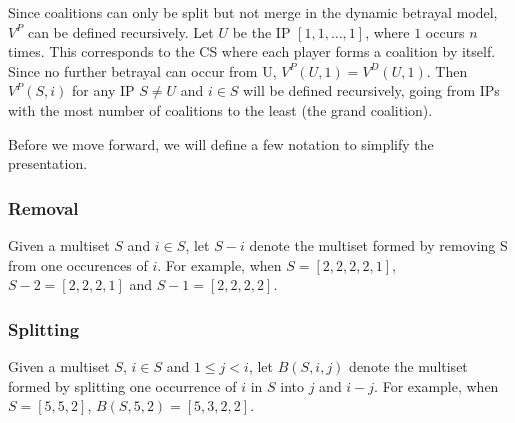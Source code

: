 \documentclass[sigconf,anonymous]{aamas}
\begin{document}
Since coalitions can only be split but not merge in the dynamic betrayal model, $V^P$ can be defined recursively. Let $U$ be the IP $[1, 1, \dots, 1]$, where $1$ occurs $n$ times. This corresponds to the CS where each player forms a coalition by itself. Since no further betrayal can occur from U, $V^P(U, 1)=V^D(U, 1)$. Then $V^P(S, i)$ for any IP $S \neq U$ and $i \in S$ will be defined recursively, going from IPs with the most number of coalitions to the least (the grand coalition).

Before we move forward, we will define a few notation to simplify the presentation. 

\subsubsection{Removal}

Given a multiset $S$ and $i\in S$, let $S - i$ denote the multiset formed by removing S from one occurences of $i$. For example, when $S=[2,2,2,2,1] $, $S-2=[2,2,2,1]$ and $S-1=[2,2,2,2]$. 

\subsubsection{Splitting}

Given a multiset $S$, $i \in S$ and $1 \leq j < i$, let $B(S, i, j)$ denote the multiset formed by splitting one occurrence of $i$ in $S$ into $j$ and $i-j$. For example, when $S=[5, 5, 2]$, $B(S, 5, 2)  =  [5, 3, 2, 2]$. 
\end{document}
